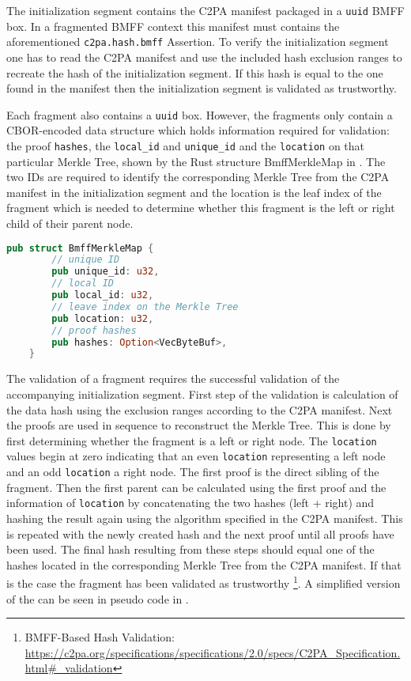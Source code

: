 The initialization segment contains the C2PA manifest packaged in a \texttt{uuid} BMFF box. In a fragmented BMFF context this manifest must contains the aforementioned \texttt{c2pa.hash.bmff} Assertion. To verify the initialization segment one has to read the C2PA manifest and use the included hash exclusion ranges to recreate the hash of the initialization segment. If this hash is equal to the one found in the manifest then the initialization segment is validated as trustworthy.

Each fragment also contains a \texttt{uuid} box. However, the fragments only contain a CBOR-encoded \cite{rfc8949} data structure which holds information required for validation: the proof \texttt{hashes}, the \texttt{local\_id} and \texttt{unique\_id} and the \texttt{location} on that particular Merkle Tree, shown by the Rust structure BmffMerkleMap in . The two IDs are required to identify the corresponding Merkle Tree from the C2PA manifest in the initialization segment and the location is the leaf index of the fragment which is needed to determine whether this fragment is the left or right child of their parent node.

\begin{minipage}{0.95\linewidth}
\begin{lstlisting}[caption={BmffMerkleMap Rust Definition}, label=code:bmff_merkle, language=Rust, captionpos=b]
    pub struct BmffMerkleMap {
        // unique ID
        pub unique_id: u32,
        // local ID
        pub local_id: u32,
        // leave index on the Merkle Tree
        pub location: u32,
        // proof hashes
        pub hashes: Option<VecByteBuf>,
    }
\end{lstlisting}
\end{minipage}

The validation of a fragment requires the successful validation of the accompanying initialization segment. First step of the validation is calculation of the data hash using the exclusion ranges according to the C2PA manifest. Next the proofs are used in sequence to reconstruct the Merkle Tree. This is done by first determining whether the fragment is a left or right node. The \texttt{location} values begin at zero indicating that an even \texttt{location} representing a left node and an odd \texttt{location} a right node. The first proof is the direct sibling of the fragment. Then the first parent can be calculated using the first proof and the information of \texttt{location} by concatenating the two hashes (left + right) and hashing the result again using the algorithm specified in the C2PA manifest. This is repeated with the newly created hash and the next proof until all proofs have been used. The final hash resulting from these steps should equal one of the hashes located in the corresponding Merkle Tree from the C2PA manifest. If that is the case the fragment has been validated as trustworthy \footnote{BMFF-Based Hash Validation: \url{https://c2pa.org/specifications/specifications/2.0/specs/C2PA_Specification.html\#_validation}}. A simplified version of the can be seen in pseudo code in .

